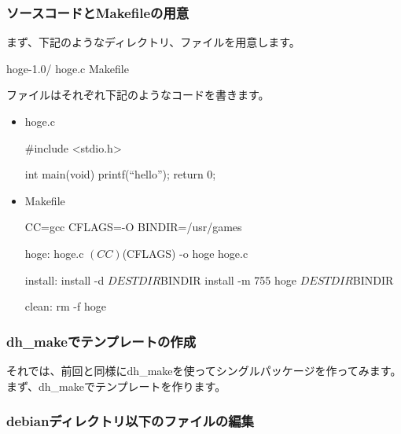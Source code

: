 \documentclass[mingoth,a4paper]{jsarticle}
\begin{document}
\subsubsection{ソースコードとMakefileの用意}
 まず、下記のようなディレクトリ、ファイルを用意します。
 \begin{commandline}
hoge-1.0/
 hoge.c
 Makefile
 \end{commandline}
 ファイルはそれぞれ下記のようなコードを書きます。
 \begin{itemize}
  \item
       hoge.c
       \begin{commandline}
#include <stdio.h>
      
int main(void)
{
       printf(``hello\n'');
       return 0;
}
       \end{commandline}
  \item
       Makefile
       \begin{commandline}
CC=gcc
CFLAGS=-O
BINDIR=/usr/games
     
hoge: hoge.c
       $(CC) $(CFLAGS) -o hoge hoge.c
       
install:
       install -d ${DESTDIR}${BINDIR}
       install -m 755 hoge ${DESTDIR}${BINDIR}
       
clean:
       rm -f hoge
       \end{commandline}
 \end{itemize}

\subsubsection{dh\_makeでテンプレートの作成}
それでは、前回と同様にdh\_makeを使ってシングルパッケージを作ってみます。
まず、dh\_makeでテンプレートを作ります。


\subsubsection{debianディレクトリ以下のファイルの編集}
\end{document}
